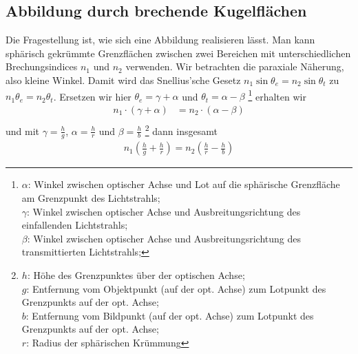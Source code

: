 \subsection{Abbildung durch brechende Kugelflächen}
Die Fragestellung ist, wie sich eine Abbildung realisieren lässt.
Man kann sphärisch gekrümmte Grenzflächen zwischen zwei Bereichen mit
unterschiedlichen Brechungsindices $n_1$ und $n_2$ verwenden.
Wir betrachten die paraxiale Näherung, also kleine Winkel.
Damit wird das Snellius'sche Gesetz $n_1\sin\theta_e =
n_2\sin\theta_t$ zu $n_1\theta_e=n_2\theta_t$.
Ersetzen wir hier $\theta_e=\gamma+\alpha$ und $\theta_t=\alpha-\beta$%
\footnote{{} $\alpha$: Winkel zwischen optischer Achse und Lot auf die sphärische
Grenzfläche am Grenzpunkt des Lichtstrahls;\\
$\gamma$: Winkel zwischen optischer Achse und Ausbreitungsrichtung des
einfallenden Lichtstrahls;\\
$\beta$: Winkel zwischen optischer Achse und Ausbreitungsrichtung des
transmittierten Lichtstrahls;}
erhalten wir
\begin{align*}
  n_1\cdot(\gamma+\alpha) &= n_2\cdot(\alpha-\beta)\\
\end{align*}
und mit
$\gamma = \frac{h}{g}$,
$\alpha =\frac{h}{r}$ und
$\beta = \frac{h}{b}$%
\footnote{{} $h$: Höhe des Grenzpunktes über der optischen Achse;\\
$g$: Entfernung vom Objektpunkt (auf der opt. Achse) zum Lotpunkt des
Grenzpunkts auf der opt. Achse;\\
$b$: Entfernung vom Bildpunkt (auf der opt. Achse) zum Lotpunkt des
Grenzpunkts auf der opt. Achse;\\
$r$: Radius der sphärischen Krümmung}
dann insgesamt
\begin{gather*}
  n_1\left(\frac{h}{g} + \frac{h}{r}\right)
  = n_2\left(\frac{h}{r} - \frac{h}{b}\right)
\end{gather*}


